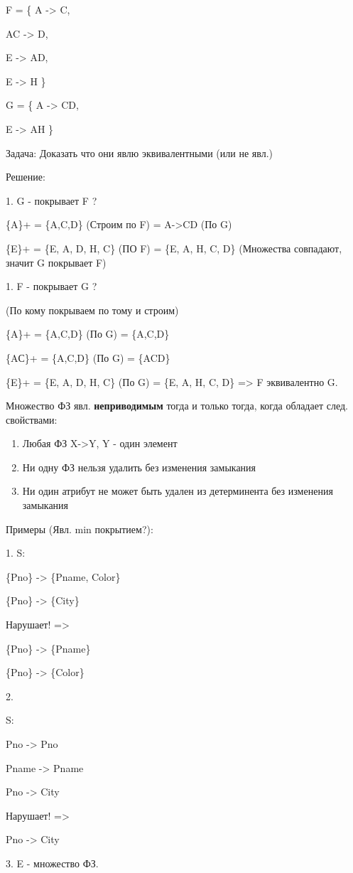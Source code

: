 F = \{
A -> C,

AC -> D,

E -> AD,

E -> H
\}

G = \{
A -> CD,

E -> AH
\}

Задача: Доказать что они явлю эквивалентными (или не явл.)

Решение:

1. G - покрывает F ?

\{A\}+ = \{A,C,D\} (Строим по F) = A->CD (По G)

\{E\}+ = \{E, A, D, H, C\} (ПО F) = \{E, A, H, C, D\} (Множества совпадают, значит G покрывает F)

1. F - покрывает G ?

(По кому покрываем по тому и строим)

\{A\}+ = \{A,C,D\} (По G) = \{A,C,D\}

\{AС\}+ = \{A,C,D\} (По G) = \{ACD\}

\{E\}+ = \{E, A, D, H, C\} (По G) = \{E, A, H, C, D\} => F эквивалентно G.

Множество ФЗ явл. \textbf{неприводимым} тогда и только тогда, когда обладает след. свойствами:

\begin{enumerate}
	\item Любая ФЗ X->Y, Y - один элемент
	\item Ни одну ФЗ нельзя удалить без изменения замыкания
	\item Ни один атрибут не может быть удален из детерминента без изменения замыкания
\end{enumerate}

Примеры (Явл. min покрытием?):

1. S:

\{Pno\} -> \{Pname, Color\}

\{Pno\} -> \{City\}

Нарушает! =>

\{Pno\} -> \{Pname\}

\{Pno\} -> \{Color\}

2.

S:

Pno -> Pno

Pname -> Pname

Pno -> City

Нарушает! =>

Pno -> City

3. E - множество ФЗ.

